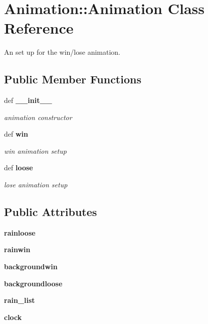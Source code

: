 \section{Animation::Animation Class Reference}
\label{classAnimation_1_1Animation}
An set up for the win/lose animation.  


\subsection*{Public Member Functions}
\begin{CompactItemize}
\item 
def \bf{\_\-\_\-init\_\-\_\-}
\begin{CompactList}\small\item\em animation constructor \item\end{CompactList}\item 
def \bf{win}
\begin{CompactList}\small\item\em win animation setup \item\end{CompactList}\item 
def \bf{loose}
\begin{CompactList}\small\item\em lose animation setup \item\end{CompactList}\end{CompactItemize}
\subsection*{Public Attributes}
\begin{CompactItemize}
\item 
\textbf{rainloose}\label{classAnimation_1_1Animation_f354ed428beb7b7c9de51ce4ca8d2c54}

\item 
\textbf{rainwin}\label{classAnimation_1_1Animation_cb2a6160f4d5dfa08d938a391e8225c7}

\item 
\textbf{backgroundwin}\label{classAnimation_1_1Animation_372ab62ca4fcfe785821525913d763ab}

\item 
\textbf{backgroundloose}\label{classAnimation_1_1Animation_0ebb0e722b3b76813c9f583a852a6995}

\item 
\textbf{rain\_\-list}\label{classAnimation_1_1Animation_e57c249c25781ed878b1f3bafdf7eda6}

\item 
\textbf{clock}\label{classAnimation_1_1Animation_15d0136cbc20ce60dec4127b3005eab1}

\end{CompactItemize}


